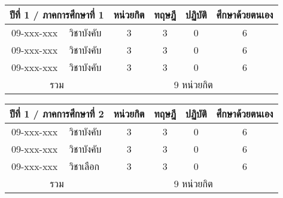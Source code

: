 \begin{tabular}{|cp{}|cccc|}
\hline
\multicolumn{2}{|c|}{ปีที่ 1 / ภาคการศึกษาที่ 1} & \multicolumn{1}{c|}{หน่วยกิต} & \multicolumn{1}{c|}{ทฤษฎี} & \multicolumn{1}{c|}{ปฏิบัติ} & ศึกษาด้วยตนเอง \\ \hline
\multicolumn{1}{|c|}{09-xxx-xxx}  & วิชาบังคับ  & \multicolumn{1}{c|}{3}        & \multicolumn{1}{c|}{3}     & \multicolumn{1}{c|}{0}       & 6             \\ \hline
\multicolumn{1}{|c|}{09-xxx-xxx}  & วิชาบังคับ  & \multicolumn{1}{c|}{3}        & \multicolumn{1}{c|}{3}     & \multicolumn{1}{c|}{0}       & 6             \\ \hline
\multicolumn{1}{|c|}{09-xxx-xxx}  & วิชาบังคับ  & \multicolumn{1}{c|}{3}        & \multicolumn{1}{c|}{3}     & \multicolumn{1}{c|}{0}       & 6             \\ \hline
\multicolumn{2}{|c|}{รวม}                        & \multicolumn{4}{c|}{9 หน่วยกิต}                                                                            \\ \hline
\end{tabular}

\vspace{5ex}\par\noindent
\begin{tabular}{|cp{}|cccc|}
\hline
\multicolumn{2}{|c|}{ปีที่ 1 / ภาคการศึกษาที่ 2} & \multicolumn{1}{c|}{หน่วยกิต} & \multicolumn{1}{c|}{ทฤษฎี} & \multicolumn{1}{c|}{ปฏิบัติ} & ศึกษาด้วยตนเอง \\ \hline
\multicolumn{1}{|c|}{09-xxx-xxx}  & วิชาบังคับ  & \multicolumn{1}{c|}{3}        & \multicolumn{1}{c|}{3}     & \multicolumn{1}{c|}{0}       & 6             \\ \hline
\multicolumn{1}{|c|}{09-xxx-xxx}  & วิชาบังคับ  & \multicolumn{1}{c|}{3}        & \multicolumn{1}{c|}{3}     & \multicolumn{1}{c|}{0}       & 6             \\ \hline
\multicolumn{1}{|c|}{09-xxx-xxx}  & วิชาเลือก  & \multicolumn{1}{c|}{3}        & \multicolumn{1}{c|}{3}     & \multicolumn{1}{c|}{0}       & 6             \\ \hline
\multicolumn{2}{|c|}{รวม}                        & \multicolumn{4}{c|}{9 หน่วยกิต}                                                                            \\ \hline
\end{tabular}

